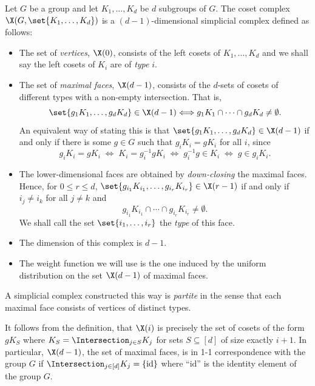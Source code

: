\documentclass{toc}
\begin{document}
\begin{definition} Let $G$ be a group and let
  $K_1,\ldots, K_d$ be $d$ subgroups of $G$. The
coset complex $\X(G,\set{K_1,\ldots, K_d})$ is a $(d-1)$-dimensional
simplicial complex defined as follows:
\begin{itemize}
\item The set of \emph{vertices}, $\X(0)$, 
consists of
the %
%
%
left cosets of $K_1,\ldots, K_d$ and we shall say
the %
left  %
cosets of $K_i$ are of \emph{type} $i$.
\item The set of \emph{maximal faces}, $\X({d-1})$,
consists of the $d$-sets of
cosets of different types with a non-empty intersection. That is,
  \[
    \set{g_1 K_1,\ldots, g_d K_d}\in \X(d-1) \Longleftrightarrow g_1 K_1 \cap \cdots \cap g_d K_d \neq \emptyset.
  \]
  An equivalent way of stating this is that $\set{g_1 K_1,\ldots, g_d K_d}\in \X(d-1)$ if and only if there is some $g \in G$ such that $g_i K_i = g K_i$ for all $i$, since
  \[
    g_i K_i = g K_i \;\Longleftrightarrow\; K_i = g_i^{-1} g K_i  \;\Longleftrightarrow\; g_{i}^{-1} g \in K_i \;\Longleftrightarrow\; g \in g_{i} K_i.
  \]
\item The 
lower-dimensional %
faces are obtained by \emph{down-closing}
  the maximal faces. Hence, for $0\leq r \leq d$, $\set{g_{i_1} K_{i_1}, \ldots, g_{i_r} K_{i_r}} \in \X(r-1)$ if and only if $i_j \neq i_k$ for all $j \neq k$ and
  \[
    g_{i_1} K_{i_1} \cap \cdots \cap g_{i_r} K_{i_r} \neq \emptyset.
  \]
  We shall call the set $\set{i_1,\ldots, i_r}$ the \emph{type} of this face.
\item The dimension of this complex is $d-1$.
\item The weight function we will use is the one induced by the
  uniform distribution on the set $\X(d-1)$ of maximal faces. 
  \qedhere
\end{itemize}
\end{definition}

A simplicial complex constructed this way is \emph{partite} in the sense that each maximal face consists of vertices of distinct types. 

It follows from the definition, that $\X(i)$ is precisely the set of
cosets of the form $g K_S$ where $K_S = \Intersection_{j\in S} K_j$
for sets $S \subseteq [d]$ of size exactly $i+1$. In particular, $\X(d-1)$, the
set of maximal faces, is in 1-1 correspondence with the group
$G$ if $\Intersection_{j\in [d]} K_j = \{\mathrm{id}\}$ where
``$\mathrm{id}$'' is the identity element of the group $G$. 
\end{document}
